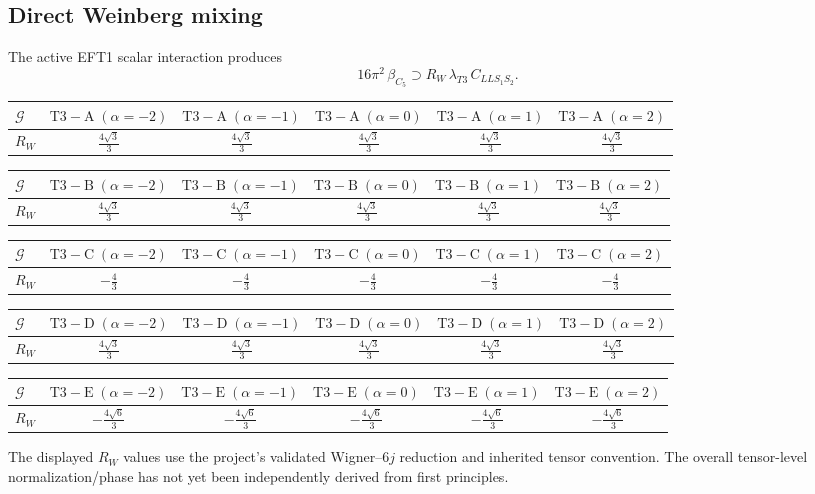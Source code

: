 \documentclass[9pt]{article}
\begin{document}
\subsection*{Direct Weinberg mixing}
The active EFT1 scalar interaction produces
\[16\pi^2\,\beta_{C_5}\supset R_W\,\lambda_{T3}\,C_{LLS_1S_2}.\]
\begin{longtable}{@{}lccccc@{}}
\toprule
$\mathcal{G}$ & $ \mathrm{T3-A}\;(\alpha=-2) $ & $ \mathrm{T3-A}\;(\alpha=-1) $ & $ \mathrm{T3-A}\;(\alpha=0) $ & $ \mathrm{T3-A}\;(\alpha=1) $ & $ \mathrm{T3-A}\;(\alpha=2) $ \\
\midrule
$R_W$ & $ \frac{4 \sqrt{3}}{3} $ & $ \frac{4 \sqrt{3}}{3} $ & $ \frac{4 \sqrt{3}}{3} $ & $ \frac{4 \sqrt{3}}{3} $ & $ \frac{4 \sqrt{3}}{3} $ \\
\bottomrule
\end{longtable}
\begin{longtable}{@{}lccccc@{}}
\toprule
$\mathcal{G}$ & $ \mathrm{T3-B}\;(\alpha=-2) $ & $ \mathrm{T3-B}\;(\alpha=-1) $ & $ \mathrm{T3-B}\;(\alpha=0) $ & $ \mathrm{T3-B}\;(\alpha=1) $ & $ \mathrm{T3-B}\;(\alpha=2) $ \\
\midrule
$R_W$ & $ \frac{4 \sqrt{3}}{3} $ & $ \frac{4 \sqrt{3}}{3} $ & $ \frac{4 \sqrt{3}}{3} $ & $ \frac{4 \sqrt{3}}{3} $ & $ \frac{4 \sqrt{3}}{3} $ \\
\bottomrule
\end{longtable}
\begin{longtable}{@{}lccccc@{}}
\toprule
$\mathcal{G}$ & $ \mathrm{T3-C}\;(\alpha=-2) $ & $ \mathrm{T3-C}\;(\alpha=-1) $ & $ \mathrm{T3-C}\;(\alpha=0) $ & $ \mathrm{T3-C}\;(\alpha=1) $ & $ \mathrm{T3-C}\;(\alpha=2) $ \\
\midrule
$R_W$ & $ - \frac{4}{3} $ & $ - \frac{4}{3} $ & $ - \frac{4}{3} $ & $ - \frac{4}{3} $ & $ - \frac{4}{3} $ \\
\bottomrule
\end{longtable}
\begin{longtable}{@{}lccccc@{}}
\toprule
$\mathcal{G}$ & $ \mathrm{T3-D}\;(\alpha=-2) $ & $ \mathrm{T3-D}\;(\alpha=-1) $ & $ \mathrm{T3-D}\;(\alpha=0) $ & $ \mathrm{T3-D}\;(\alpha=1) $ & $ \mathrm{T3-D}\;(\alpha=2) $ \\
\midrule
$R_W$ & $ \frac{4 \sqrt{3}}{3} $ & $ \frac{4 \sqrt{3}}{3} $ & $ \frac{4 \sqrt{3}}{3} $ & $ \frac{4 \sqrt{3}}{3} $ & $ \frac{4 \sqrt{3}}{3} $ \\
\bottomrule
\end{longtable}
\begin{longtable}{@{}lccccc@{}}
\toprule
$\mathcal{G}$ & $ \mathrm{T3-E}\;(\alpha=-2) $ & $ \mathrm{T3-E}\;(\alpha=-1) $ & $ \mathrm{T3-E}\;(\alpha=0) $ & $ \mathrm{T3-E}\;(\alpha=1) $ & $ \mathrm{T3-E}\;(\alpha=2) $ \\
\midrule
$R_W$ & $ - \frac{4 \sqrt{6}}{3} $ & $ - \frac{4 \sqrt{6}}{3} $ & $ - \frac{4 \sqrt{6}}{3} $ & $ - \frac{4 \sqrt{6}}{3} $ & $ - \frac{4 \sqrt{6}}{3} $ \\
\bottomrule
\end{longtable}
The displayed $R_W$ values use the project's validated Wigner--$6j$ reduction and inherited tensor convention.  The overall tensor-level normalization/phase has not yet been independently derived from first principles.
\end{document}
